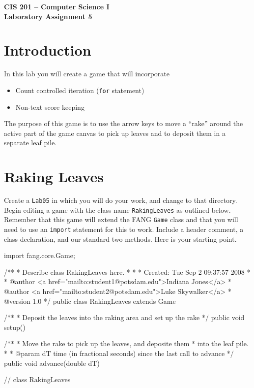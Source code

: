 \documentclass[12pt]{article}
\newenvironment{qv}%
  {\quote
   \verbatim}%
  {\endverbatim
   \endquote}
\newcommand{\code}{\texttt}
\newcommand{\fname}{\texttt}
\begin{document}
\sloppypar

\begin{center}
\Large\bf
CIS 201 -- Computer Science I\\
Laboratory Assignment 5\\
\end{center}

\section*{Introduction}
In this lab you will create a game that will incorporate 
\begin{itemize}
\item Count controlled iteration (\code{for} statement)
\item Non-text score keeping
\end{itemize}
The purpose of this game is to use the arrow keys
to move a ``rake'' around the active part of the game canvas to pick up leaves
and to deposit them in a separate leaf pile.

\section*{Raking Leaves}
Create a \fname{Lab05} in which you will do your work,
and change to that directory.
Begin editing a game with the class name \code{RakingLeaves}
as outlined below.
Remember that this game will extend the FANG \code{Game} class
and that you will need to use an \code{import} statement
for this to work.
Include a header comment, a class declaration, and our standard two methods.
Here is your starting point.

\begin{qv}
import fang.core.Game;

/**
 * Describe class RakingLeaves here.
 *
 *
 * Created: Tue Sep  2 09:37:57 2008
 *
 * @author <a href="mailto:student1@potsdam.edu">Indiana Jones</a>
 * @author <a href="mailto:student2@potsdam.edu">Luke Skywalker</a>
 * @version 1.0
 */
public class RakingLeaves extends Game {

  /**
   * Deposit the leaves into the raking area and set up the rake
   */
  public void setup() {
    
  }
  
  /**
   * Move the rake to pick up the leaves, and deposite them
   * into the leaf pile.
   * 
   * @param dT time (in fractional seconds) since the last call to advance
   */
  public void advance(double dT) {
    
  }
} // class RakingLeaves
\end{qv}
\end{document}
